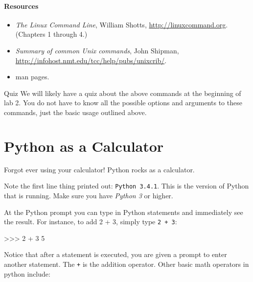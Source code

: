 \documentclass[11pt]{cselabheader}
\begin{document}
\paragraph*{Resources}

\begin{itemize}
  \item \textit{The Linux Command Line}, William Shotts,
    \url{http://linuxcommand.org}. (Chapters 1 through 4.)
  \item \textit{Summary of common Unix commands}, John Shipman,
    \url{http://infohost.nmt.edu/tcc/help/pubs/unixcrib/}.
  \item man pages.
\end{itemize}

\begin{warningbox}{Quiz}
  We will likely have a quiz about the above commands at the beginning of lab 2.
  You do not have to know all the possible options and arguments to these
  commands, just the basic usage outlined above.
\end{warningbox}

\pagebreak
\section{Python as a Calculator}
\label{sec:python-calc}
Forgot ever using your calculator! Python rocks as a calculator.


Note the first line thing printed out: \texttt{Python 3.4.1}. This is the
version of Python that is running. Make sure you have \emph{Python 3} or higher.

At the Python prompt \pyconinline{>>>} you can type in Python statements and
immediately see the result. For instance, to add 2 + 3, simply type \texttt{2 +
3}: 

\begin{pyconcode}
>>> 2 + 3
5
\end{pyconcode}

Notice that after a statement is executed, you are given a prompt to enter
another statement. The \texttt{+} is the addition operator. Other basic math
operators in python include:
\end{document}
